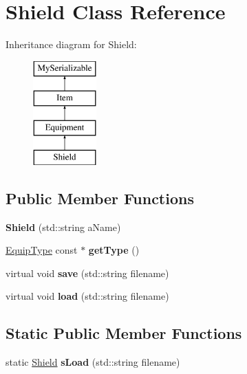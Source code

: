 \hypertarget{class_shield}{}\section{Shield Class Reference}
\label{class_shield}
Inheritance diagram for Shield\+:\begin{figure}[H]
\begin{center}
\leavevmode
\includegraphics[height=4.000000cm]{class_shield}
\end{center}
\end{figure}
\subsection*{Public Member Functions}
\begin{DoxyCompactItemize}
\item 
\hypertarget{class_shield_a1e9be80b91c5d7014040cb8b0b1be617}{}\label{class_shield_a1e9be80b91c5d7014040cb8b0b1be617} 
{\bfseries Shield} (std\+::string a\+Name)
\item 
\hypertarget{class_shield_a3638b0f119c2a80a35fc5a0a8a1149b7}{}\label{class_shield_a3638b0f119c2a80a35fc5a0a8a1149b7} 
\hyperlink{class_equip_type}{Equip\+Type} const  $\ast$ {\bfseries get\+Type} ()
\item 
\hypertarget{class_shield_acc7d400fb1ec819120f790a9bf85f6e9}{}\label{class_shield_acc7d400fb1ec819120f790a9bf85f6e9} 
virtual void {\bfseries save} (std\+::string filename)
\item 
\hypertarget{class_shield_a8b4e9e3b143f67400d082b2aec8fa430}{}\label{class_shield_a8b4e9e3b143f67400d082b2aec8fa430} 
virtual void {\bfseries load} (std\+::string filename)
\end{DoxyCompactItemize}
\subsection*{Static Public Member Functions}
\begin{DoxyCompactItemize}
\item 
\hypertarget{class_shield_a57f4a10d8516f2fdf6a790c553bcd4e5}{}\label{class_shield_a57f4a10d8516f2fdf6a790c553bcd4e5} 
static \hyperlink{class_shield}{Shield} {\bfseries s\+Load} (std\+::string filename)
\end{DoxyCompactItemize}
